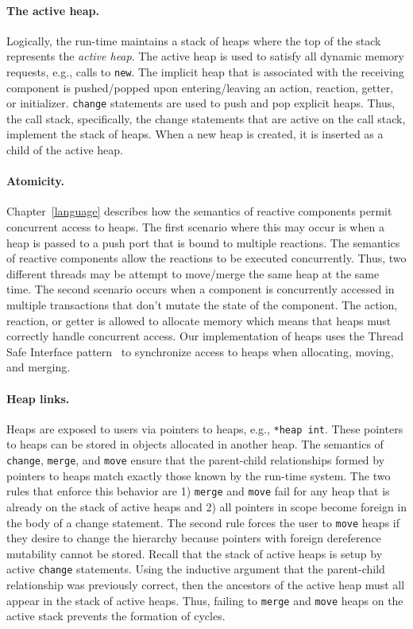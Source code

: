 \paragraph{The active heap.}
Logically, the run-time maintains a stack of heaps where the top of the stack represents the \emph{active heap}.
The active heap is used to satisfy all dynamic memory requests, e.g., calls to \verb+new+.
The implicit heap that is associated with the receiving component is pushed/popped upon entering/leaving an action, reaction, getter, or initializer.
\verb+change+ statements are used to push and pop explicit heaps.
Thus, the call stack, specifically, the change statements that are active on the call stack, implement the stack of heaps.
When a new heap is created, it is inserted as a child of the active heap.

\paragraph{Atomicity.}
Chapter~\ref{language} describes how the semantics of reactive components permit concurrent access to heaps.
The first scenario where this may occur is when a heap is passed to a push port that is bound to multiple reactions.
The semantics of reactive components allow the reactions to be executed concurrently.
Thus, two different threads may be attempt to move/merge the same heap at the same time.
The second scenario occurs when a component is concurrently accessed in multiple transactions that don't mutate the state of the component.
The action, reaction, or getter is allowed to allocate memory which means that heaps must correctly handle concurrent access.
Our implementation of heaps uses the Thread Safe Interface pattern~\cite{schmidt2000pattern} to synchronize access to heaps when allocating, moving, and merging.

\paragraph{Heap links.}
Heaps are exposed to users via pointers to heaps, e.g., \verb+*heap int+.
These pointers to heaps can be stored in objects allocated in another heap.
The semantics of \verb+change+, \verb+merge+, and \verb+move+ ensure that the parent-child relationships formed by pointers to heaps match exactly those known by the run-time system.
The two rules that enforce this behavior are 1) \verb+merge+ and \verb+move+ fail for any heap that is already on the stack of active heaps and 2) all pointers in scope become foreign in the body of a change statement.
The second rule forces the user to \verb+move+ heaps if they desire to change the hierarchy because pointers with foreign dereference mutability cannot be stored.
Recall that the stack of active heaps is setup by active \verb+change+ statements.
Using the inductive argument that the parent-child relationship was previously correct, then the ancestors of the active heap must all appear in the stack of active heaps.
Thus, failing to \verb+merge+ and \verb+move+ heaps on the active stack prevents the formation of cycles.


